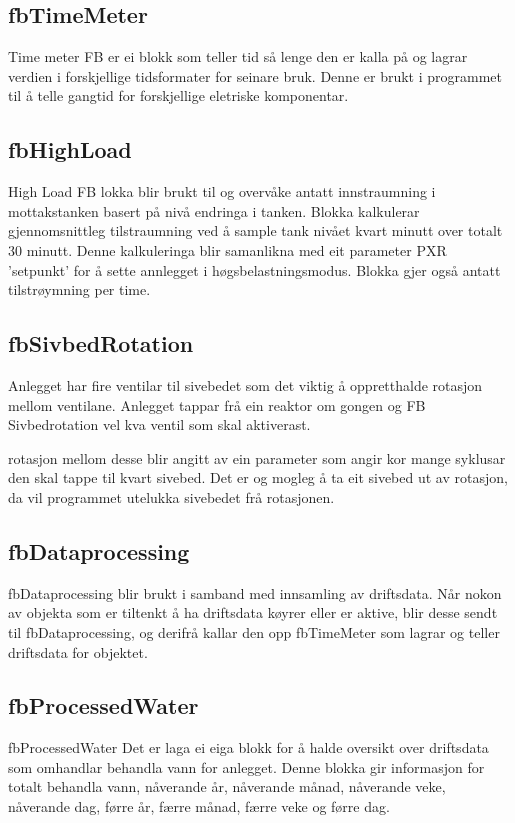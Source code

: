 \subsection{fbTimeMeter}
Time meter \gls{FB} er ei blokk som teller tid så lenge den er kalla på og lagrar verdien i forskjellige tidsformater for seinare bruk.
Denne er brukt i programmet til å telle gangtid for forskjellige eletriske komponentar.

\subsection{fbHighLoad}
High Load \gls{FB} lokka blir brukt til og overvåke antatt innstraumning i mottakstanken basert på nivå endringa i tanken. 
Blokka kalkulerar gjennomsnittleg tilstraumning ved å sample tank nivået kvart minutt over totalt 30 minutt.
Denne kalkuleringa blir samanlikna med eit parameter PXR 'setpunkt' for å sette annlegget i høgsbelastningsmodus.
Blokka gjer også antatt tilstrøymning per time.

\subsection{fbSivbedRotation}
Anlegget har fire ventilar til sivebedet som det viktig å oppretthalde rotasjon mellom ventilane. Anlegget tappar frå ein reaktor om gongen 
og \gls{FB} Sivbedrotation vel kva ventil som skal aktiverast.

rotasjon mellom desse blir angitt av ein parameter som angir kor mange syklusar den skal tappe til kvart sivebed. 
Det er og mogleg å ta eit sivebed ut av rotasjon, da vil programmet utelukka sivebedet frå rotasjonen.

\subsection{fbDataprocessing}
fbDataprocessing blir brukt i samband med innsamling av driftsdata. 
Når nokon av objekta som er tiltenkt å ha driftsdata køyrer eller er aktive, blir desse sendt til fbDataprocessing, og derifrå kallar den opp fbTimeMeter som lagrar og teller driftsdata for objektet.

\subsection{fbProcessedWater}
fbProcessedWater 
Det er laga ei eiga blokk for å halde oversikt over driftsdata som omhandlar behandla vann for anlegget. 
Denne blokka gir informasjon for totalt behandla vann, nåverande år, nåverande månad, nåverande veke, nåverande dag, førre år, færre månad, færre veke og førre dag.